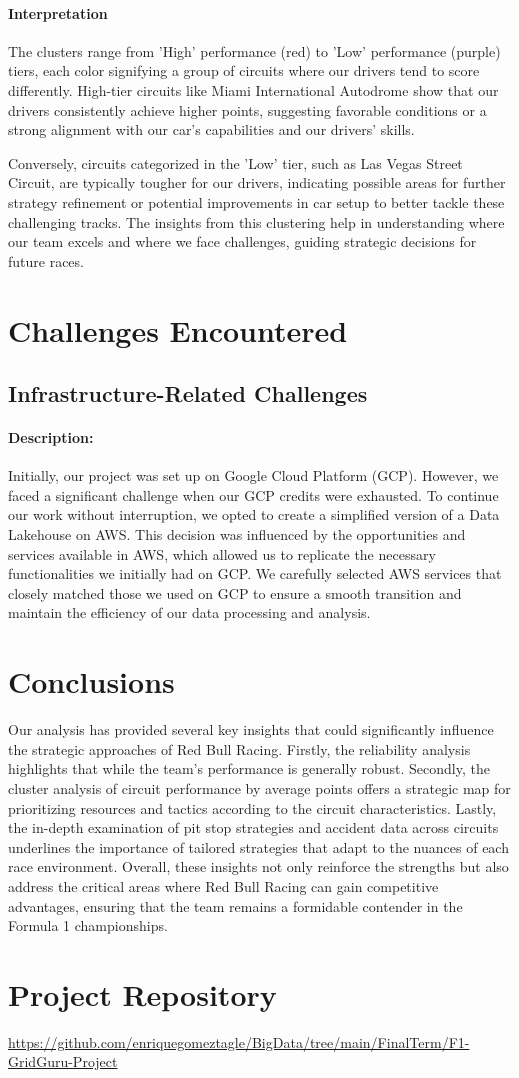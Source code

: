 \documentclass{article}
\begin{document}
\paragraph{Interpretation}
The clusters range from 'High' performance (red) to 'Low' performance (purple) tiers, each color signifying a group of circuits where our drivers tend to score differently. High-tier circuits like Miami International Autodrome show that our drivers consistently achieve higher points, suggesting favorable conditions or a strong alignment with our car's capabilities and our drivers' skills.

Conversely, circuits categorized in the 'Low' tier, such as Las Vegas Street Circuit, are typically tougher for our drivers, indicating possible areas for further strategy refinement or potential improvements in car setup to better tackle these challenging tracks. The insights from this clustering help in understanding where our team excels and where we face challenges, guiding strategic decisions for future races.



\section{Challenges Encountered}
\subsection{Infrastructure-Related Challenges}
\paragraph{Description:}
Initially, our project was set up on Google Cloud Platform (GCP). However, we faced a significant challenge when our GCP credits were exhausted. To continue our work without interruption, we opted to create a simplified version of a Data Lakehouse on AWS. This decision was influenced by the opportunities and services available in AWS, which allowed us to replicate the necessary functionalities we initially had on GCP. We carefully selected AWS services that closely matched those we used on GCP to ensure a smooth transition and maintain the efficiency of our data processing and analysis.


\section{Conclusions}
Our analysis has provided several key insights that could significantly influence the strategic approaches of Red Bull Racing. Firstly, the reliability analysis highlights that while the team's performance is generally robust. Secondly, the cluster analysis of circuit performance by average points offers a strategic map for prioritizing resources and tactics according to the circuit characteristics. Lastly, the in-depth examination of pit stop strategies and accident data across circuits underlines the importance of tailored strategies that adapt to the nuances of each race environment. Overall, these insights not only reinforce the strengths but also address the critical areas where Red Bull Racing can gain competitive advantages, ensuring that the team remains a formidable contender in the Formula 1 championships.

\section{Project Repository}
\url{https://github.com/enriquegomeztagle/BigData/tree/main/FinalTerm/F1-GridGuru-Project}
\end{document}
